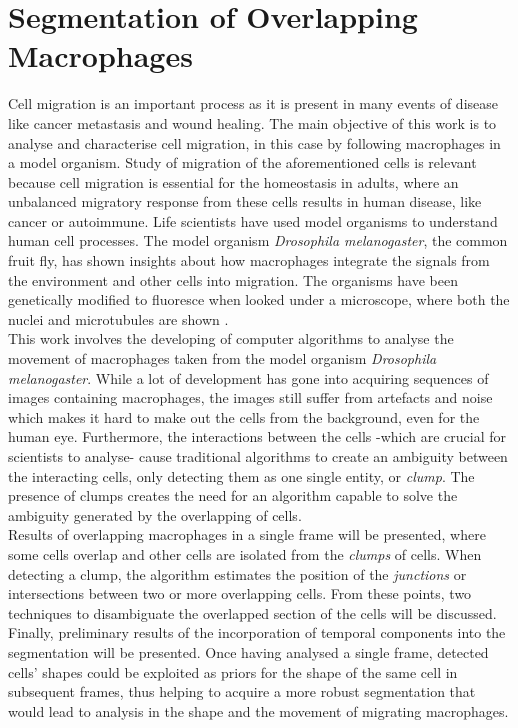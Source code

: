   \section*{Segmentation of Overlapping Macrophages}
%
Cell migration is an important process as it is present in many events of
disease like cancer metastasis and wound healing.
The main objective of this work is to analyse and characterise cell
migration, in this case by following macrophages in a model organism.
Study of migration of the aforementioned cells is relevant because
cell migration is essential for the homeostasis in adults\cite{pocha2014},
where an unbalanced migratory response from these cells results in
human disease, like cancer or autoimmune.
Life scientists have used model organisms to understand human cell processes.
The model organism \emph{Drosophila melanogaster}, the common fruit fly,
has shown insights about how macrophages integrate the signals
from the environment and other cells into migration\cite{wood2017}.
The organisms have been genetically modified to fluoresce
when looked under a microscope, where both the nuclei and
microtubules are shown \cite{Stramer2010}.
\medskip\\
%
This work involves the developing of computer algorithms to analyse the
movement of macro\-phages taken from the model organism
\emph{Drosophila melanogaster}. While a lot of development
has gone into acquiring sequences of images containing macrophages,
the images still suffer from artefacts and noise which makes it hard to
make out the cells from the background, even for the human eye.
Furthermore, the interactions between the cells
-which are crucial for scientists to analyse-
cause traditional algorithms\cite{Henry2013,lu2015,Caselles}
to create an ambiguity between the interacting cells, only detecting them
as one single entity, or \emph{clump}.
The presence of clumps creates the need for an algorithm capable to solve
the ambiguity generated by the overlapping of cells.
\medskip\\
%
Results of overlapping macrophages in a single frame will be
presented, where some cells overlap and other cells are
isolated from the \emph{clumps} of cells. When detecting a clump,
the algorithm estimates the position of the \emph{junctions} or intersections
between two or more overlapping cells. From these points, two techniques
to disambiguate the overlapped section of the cells will be discussed.
Finally, preliminary results of the incorporation of temporal components
into the segmentation will be presented. Once having analysed a single
frame, detected cells' shapes could be exploited as priors for the
shape of the same cell in subsequent frames, thus helping to acquire a
more robust segmentation that would lead to analysis in the shape and the
movement of migrating macrophages. 
